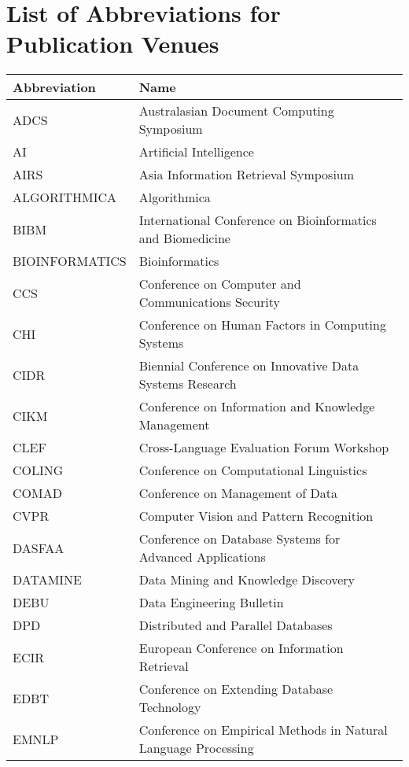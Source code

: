 \chapter{List of Abbreviations for Publication Venues}\label{sec:venues}

\begin{table}[h]
\scriptsize
\centering
\begin{tabular}{ll} 
\toprule
Abbreviation & Name          \\
\midrule
ADCS					&		Australasian Document Computing Symposium  \\ 
AI					&		Artificial Intelligence  \\ 
AIRS					&		Asia Information Retrieval Symposium  \\ 
ALGORITHMICA					&		Algorithmica  \\ 
BIBM					&		International Conference on Bioinformatics and Biomedicine  \\ 
BIOINFORMATICS					&		Bioinformatics  \\ 
CCS					&		Conference on Computer and Communications Security  \\ 
CHI					&		Conference on Human Factors in Computing Systems  \\ 
CIDR					&		Biennial Conference on Innovative Data Systems Research  \\ 
CIKM					&		Conference on Information and Knowledge Management  \\ 
CLEF					&		Cross-Language Evaluation Forum Workshop  \\ 
COLING					&		Conference on Computational Linguistics  \\ 
COMAD					&		Conference on Management of Data  \\ 
CVPR					&		Computer Vision and Pattern Recognition  \\ 
DASFAA					&		Conference on Database Systems for Advanced Applications  \\ 
DATAMINE					&		Data Mining and Knowledge Discovery  \\ 
DEBU					&		Data Engineering Bulletin  \\ 
DPD					&		Distributed and Parallel Databases  \\ 
ECIR					&		European Conference on Information Retrieval  \\ 
EDBT					&		Conference on Extending Database Technology  \\ 
EMNLP					&		Conference on Empirical Methods in Natural Language Processing  \\ 

\end{tabular}
\end{table}
